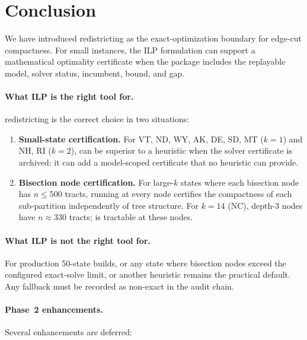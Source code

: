 \section{Conclusion}
\label{sec:conclusion}

We have introduced \ilp{} redistricting as the exact-optimization boundary for
edge-cut compactness.  For small instances, the ILP formulation can support a
mathematical optimality certificate when the package includes the replayable
model, solver status, incumbent, bound, and gap.

\paragraph{What ILP is the right tool for.}
\ilp{} redistricting is the correct choice in two situations:

\begin{enumerate}
\item \textbf{Small-state certification.}
  For VT, ND, WY, AK, DE, SD, MT ($k=1$) and NH, RI ($k=2$), \ilp{}
  can be superior to a heuristic when the solver certificate is archived:
  it can add a model-scoped certificate that no heuristic can provide.

\item \textbf{Bisection node certification.}
  For large-$k$ states where each bisection node has $n \leq 500$ tracts,
  running \ilp{} at every node certifies the compactness of each sub-partition
  independently of tree structure.
  For $k = 14$ (NC), depth-3 nodes have $n \approx 330$ tracts; \ilp{}
  is tractable at these nodes.
\end{enumerate}

\paragraph{What ILP is not the right tool for.}
For production 50-state builds, or any state where bisection nodes exceed the
configured exact-solve limit, \metis{} or another heuristic remains the
practical default.  Any fallback must be recorded as non-exact in the audit
chain.

\paragraph{Phase~2 enhancements.}
Several enhancements are deferred:

